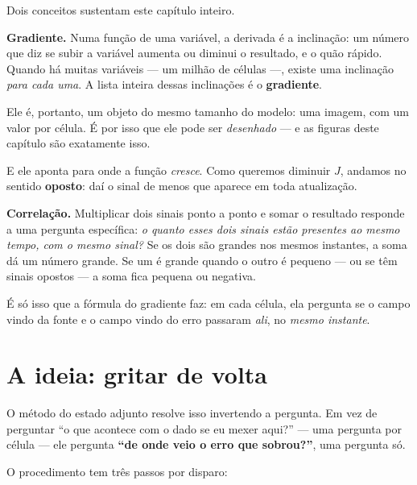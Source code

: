 \documentclass[11pt,a4paper,oneside]{report}
\begin{document}
\begin{matematica}
Dois conceitos sustentam este cap\'itulo inteiro.

\textbf{Gradiente.} Numa fun\c{c}\~ao de uma vari\'avel, a derivada \'e a
inclina\c{c}\~ao: um n\'umero que diz se subir a vari\'avel aumenta ou diminui
o resultado, e o qu\~ao r\'apido. Quando h\'a muitas vari\'aveis --- um
milh\~ao de c\'elulas ---, existe uma inclina\c{c}\~ao \emph{para cada uma}.
A lista inteira dessas inclina\c{c}\~oes \'e o \textbf{gradiente}.

Ele \'e, portanto, um objeto do mesmo tamanho do modelo: uma imagem, com um
valor por c\'elula. \'E por isso que ele pode ser \emph{desenhado} --- e as
figuras deste cap\'itulo s\~ao exatamente isso.

E ele aponta para onde a fun\c{c}\~ao \emph{cresce}. Como queremos diminuir
$J$, andamos no sentido \textbf{oposto}: da\'i o sinal de menos que aparece em
toda atualiza\c{c}\~ao.

\textbf{Correla\c{c}\~ao.} Multiplicar dois sinais ponto a ponto e somar o
resultado responde a uma pergunta espec\'ifica: \emph{o quanto esses dois
sinais est\~ao presentes ao mesmo tempo, com o mesmo sinal?} Se os dois s\~ao
grandes nos mesmos instantes, a soma d\'a um n\'umero grande. Se um \'e grande
quando o outro \'e pequeno --- ou se t\^em sinais opostos --- a soma fica
pequena ou negativa.

\'E s\'o isso que a f\'ormula do gradiente faz: em cada c\'elula, ela pergunta
se o campo vindo da fonte e o campo vindo do erro passaram \emph{ali}, no
\emph{mesmo instante}.
\end{matematica}

\section{A ideia: gritar de volta}

O m\'etodo do estado adjunto resolve isso invertendo a pergunta. Em vez de
perguntar ``o que acontece com o dado se eu mexer aqui?'' --- uma pergunta por
c\'elula --- ele pergunta \textbf{``de onde veio o erro que sobrou?''}, uma
pergunta s\'o.

O procedimento tem tr\^es passos por disparo:
\end{document}
